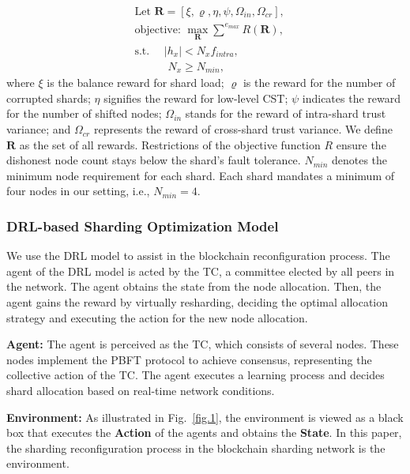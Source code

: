 \begin{equation}
    \begin{aligned}
    \label{eq:22}
    &\text{Let } \mathbf{R} = [\xi, \varrho, \eta, \psi, \Omega_{in},\Omega_{cr}],\\
    &\text{objective: } \max_{\mathbf{R}} \sum^{e_{max}} R(\mathbf{R}),\\
    &\text{s.t. } \quad |h_x| < N_x f_{intra},\\ 
    &\quad\quad\quad N_x \geq N_{min},
    \end{aligned}
\end{equation}
where $\xi$ is the balance reward for shard load; $\varrho$ is the reward for the number of corrupted shards; $\eta$ signifies the reward for low-level CST; $\psi$ indicates the reward for the number of shifted nodes; $\Omega_{in}$ stands for the reward of intra-shard trust variance; and $\Omega_{cr}$ represents the reward of cross-shard trust variance. We define $\mathbf{R}$ as the set of all rewards. Restrictions of the objective function $R$ ensure the dishonest node count stays below the shard's fault tolerance. $N_{min}$ denotes the minimum node requirement for each shard. Each shard mandates a minimum of four nodes in our setting, i.e., $N_{min} = 4$.



\subsubsection{DRL-based Sharding Optimization Model}

We use the DRL model to assist in the blockchain reconfiguration process. The agent of the DRL model is acted by the TC, a committee elected by all peers in the network. The agent obtains the state from the node allocation. Then, the agent gains the reward by virtually resharding, deciding the optimal allocation strategy and executing the action for the new node allocation.

\smallskip
\noindent\textbf{Agent:}
The agent is perceived as the TC, which consists of several nodes. These nodes implement the PBFT protocol to achieve consensus, representing the collective action of the TC. The agent executes a learning process and decides shard allocation based on real-time network conditions. 


\smallskip
\noindent\textbf{Environment:}
As illustrated in Fig.~\ref{fig.1}, the environment is viewed as a black box that executes the \textbf{Action} of the agents and obtains the \textbf{State}. In this paper, the sharding reconfiguration process in the blockchain sharding network is the environment.




